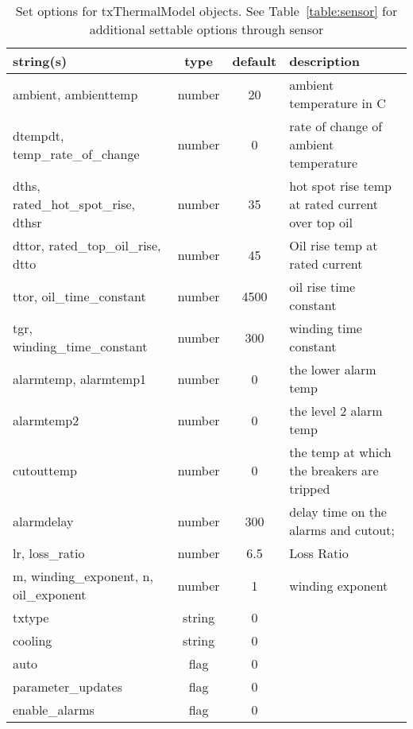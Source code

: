 \begin{table}[ht]
\centering
\begin{tabular}{p{5cm} c c p{7cm}}
\hline
string(s) & type & default & description \\
\hline
ambient, ambienttemp & number & 20 & ambient temperature in C\\
dtempdt, temp\_rate\_of\_change & number & 0 & rate of change of ambient temperature\\
dths, rated\_hot\_spot\_rise, dthsr & number & 35 & hot spot rise temp at rated current over top oil\\
dttor, rated\_top\_oil\_rise, dtto & number & 45 & Oil rise temp at rated current\\
ttor, oil\_time\_constant & number & 4500 & oil rise time constant\\
tgr, winding\_time\_constant & number & 300 & winding time constant\\
alarmtemp, alarmtemp1 & number & 0 & the lower alarm temp\\
alarmtemp2 & number & 0 & the level 2 alarm temp\\
cutouttemp & number & 0 & the temp at which the breakers are tripped\\
alarmdelay & number & 300 & delay time on the alarms and cutout;\\
lr, loss\_ratio & number & 6.5 & Loss Ratio\\
m, winding\_exponent, n, oil\_exponent & number & 1 & winding exponent\\
txtype & string & 0 & \\
cooling & string & 0 & \\
auto & flag & 0 & \\
parameter\_updates & flag & 0 & \\
enable\_alarms & flag & 0 & \\
\hline
\end{tabular}
\caption{Set options for txThermalModel objects. See Table~\ref{table:sensor} for additional settable options through sensor}
\label{table:txThermalModel}
\end{table}

